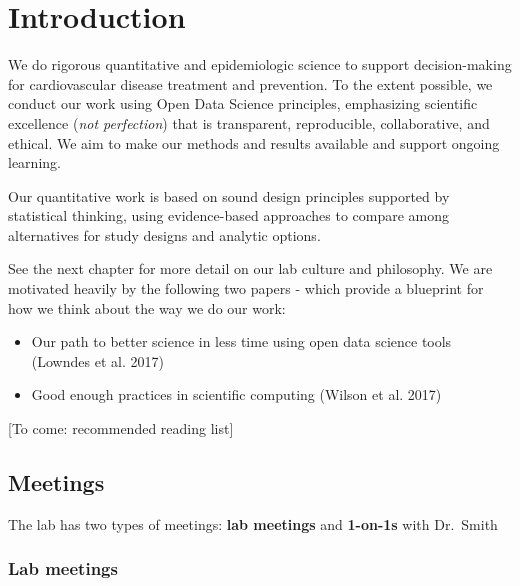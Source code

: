 \documentclass[
  letterpaper,
  DIV=11,
  numbers=noendperiod]{scrreprt}
\providecommand{\tightlist}{%
  \setlength{\itemsep}{0pt}\setlength{\parskip}{0pt}}\usepackage{longtable,booktabs,array}
\begin{document}

\hypertarget{intro}{%
\chapter{Introduction}\label{intro}}

We do rigorous quantitative and epidemiologic science to support
decision-making for cardiovascular disease treatment and prevention. To
the extent possible, we conduct our work using Open Data Science
principles, emphasizing scientific excellence (\emph{not perfection})
that is transparent, reproducible, collaborative, and ethical. We aim to
make our methods and results available and support ongoing learning.

Our quantitative work is based on sound design principles supported by
statistical thinking, using evidence-based approaches to compare among
alternatives for study designs and analytic options.

See the next chapter for more detail on our lab culture and philosophy.
We are motivated heavily by the following two papers - which provide a
blueprint for how we think about the way we do our work:

\begin{itemize}
\tightlist
\item
  Our path to better science in less time using open data science tools
  (Lowndes et al. 2017)
\item
  Good enough practices in scientific computing (Wilson et al. 2017)
\end{itemize}

{[}To come: recommended reading list{]}

\hypertarget{meetings}{%
\section{Meetings}\label{meetings}}

The lab has two types of meetings: \textbf{lab meetings} and
\textbf{1-on-1s} with Dr.~Smith

\hypertarget{lab-meetings}{%
\subsection{Lab meetings}\label{lab-meetings}}
\end{document}
